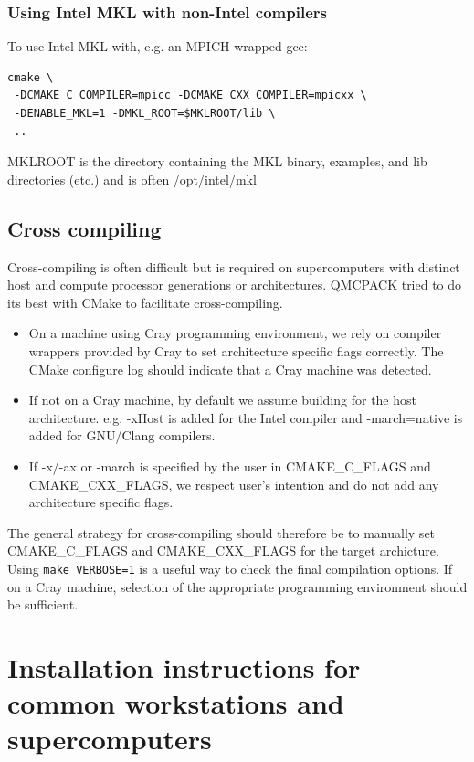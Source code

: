 \subsubsection{Using Intel MKL with non-Intel compilers}

To use Intel MKL with, e.g. an MPICH wrapped gcc:
\verbatimfont{\footnotesize}
\begin{verbatim}
cmake \
 -DCMAKE_C_COMPILER=mpicc -DCMAKE_CXX_COMPILER=mpicxx \
 -DENABLE_MKL=1 -DMKL_ROOT=$MKLROOT/lib \
 ..
\end{verbatim}

MKLROOT is the directory containing the MKL binary, examples, and lib
directories (etc.) and is often /opt/intel/mkl

\subsection{Cross compiling}
Cross-compiling is often difficult but is required on supercomputers
with distinct host and compute processor generations or architectures.
QMCPACK tried to do its best with CMake to facilitate cross-compiling.

\begin{itemize}
  \item On a machine using Cray programming environment, we rely on
      compiler wrappers provided by Cray to set architecture specific
      flags correctly. The CMake configure log should indicate that a
      Cray machine was detected.
  \item If not on a Cray machine, by default we assume building for
    the host architecture. e.g. -xHost is added for the Intel compiler
    and -march=native is added for GNU/Clang compilers.
  \item If -x/-ax or -march is specified by the user in CMAKE\_C\_FLAGS and CMAKE\_CXX\_FLAGS,
    we respect user's intention and do not add any architecture specific flags.
\end{itemize}

The general strategy for cross-compiling should therefore be to
manually set CMAKE\_C\_FLAGS and CMAKE\_CXX\_FLAGS for the target
archicture. Using \texttt{make VERBOSE=1} is a useful way to check the
final compilation options.  If on a Cray machine, selection of the
appropriate programming environment should be sufficient.

\section{Installation instructions for common workstations and
  supercomputers}
\label{sec:installexamples}

